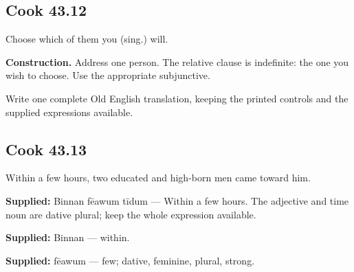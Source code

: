 \par\begin{minipage}{\linewidth}\raggedright
\subsection*{Cook 43.12}

Choose which of them you (sing.) will.

\textbf{Construction.} Address one person. The relative clause is indefinite: the one you wish to choose. Use the appropriate subjunctive.

Write one complete Old English translation, keeping the printed controls and the supplied expressions available.

\end{minipage}\par\addvspace{4pt}

\par\begin{minipage}{\linewidth}\raggedright
\subsection*{Cook 43.13}

Within a few hours, two educated and high-born men came toward him.

\end{minipage}\par\addvspace{4pt}

\textbf{Supplied:} Binnan fēawum tīdum — Within a few hours. The adjective and time noun are dative plural; keep the whole expression available.

\textbf{Supplied:} Binnan — within.

\textbf{Supplied:} fēawum — few; dative, feminine, plural, strong.

